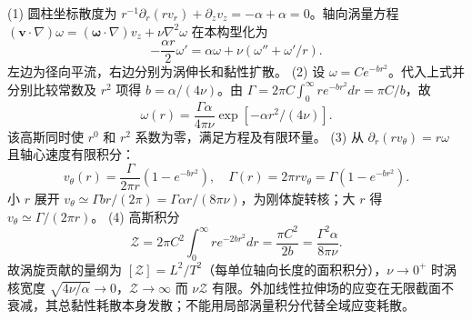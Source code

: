 (1) 圆柱坐标散度为 \(r^{-1}\partial_r(rv_r)+\partial_zv_z=-\alpha+\alpha=0\)。轴向涡量方程 \((\boldsymbol v\cdot\nabla)\omega=(\boldsymbol\omega\cdot\nabla)v_z+\nu\nabla^2\omega\) 在本构型化为
\[
-\frac{\alpha r}{2}\omega'=\alpha\omega+\nu(\omega''+\omega'/r).
\]
左边为径向平流，右边分别为涡伸长和黏性扩散。
(2) 设 \(\omega=C e^{-br^2}\)。代入上式并分别比较常数及 \(r^2\) 项得 \(b=\alpha/(4\nu)\)。由 \(\Gamma=2\pi C\int_0^\infty re^{-br^2}dr=\pi C/b\)，故
\[
\omega(r)=\frac{\Gamma\alpha}{4\pi\nu}\exp[-\alpha r^2/(4\nu)].
\]
该高斯同时使 \(r^0\) 和 \(r^2\) 系数为零，满足方程及有限环量。
(3) 从 \(\partial_r(rv_\theta)=r\omega\) 且轴心速度有限积分：
\[
v_\theta(r)=\frac{\Gamma}{2\pi r}(1-e^{-br^2}),\quad
\Gamma(r)=2\pi rv_\theta=\Gamma(1-e^{-br^2}).
\]
小 \(r\) 展开 \(v_\theta\simeq \Gamma br/(2\pi)=\Gamma\alpha r/(8\pi\nu)\)，为刚体旋转核；大 \(r\) 得 \(v_\theta\simeq\Gamma/(2\pi r)\)。
(4) 高斯积分
\[
\mathcal Z=2\pi C^2\int_0^\infty re^{-2br^2}dr=\frac{\pi C^2}{2b}=\frac{\Gamma^2\alpha}{8\pi\nu}.
\]
故涡旋贡献的量纲为 \([\mathcal Z]=L^2/T^2\)（每单位轴向长度的面积积分），\(\nu\to0^+\) 时涡核宽度 \(\sqrt{4\nu/\alpha}\to0\)，\(\mathcal Z\to\infty\) 而 \(\nu\mathcal Z\) 有限。外加线性拉伸场的应变在无限截面不衰减，其总黏性耗散本身发散；不能用局部涡量积分代替全域应变耗散。
